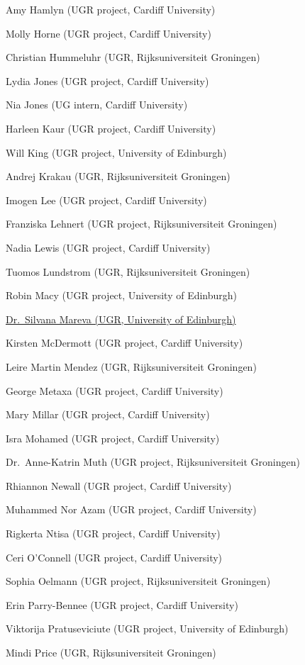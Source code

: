 \documentclass[
  12pt,
]{book}
\begin{document}
Amy Hamlyn (UGR project, Cardiff University)

Molly Horne (UGR project, Cardiff University)

Christian Hummeluhr (UGR, Rijksuniversiteit Groningen)

Lydia Jones (UGR project, Cardiff University)

Nia Jones (UG intern, Cardiff University)

Harleen Kaur (UGR project, Cardiff University)

Will King (UGR project, University of Edinburgh)

Andrej Krakau (UGR, Rijksuniversiteit Groningen)

Imogen Lee (UGR project, Cardiff University)

Franziska Lehnert (UGR project, Rijksuniversiteit Groningen)

Nadia Lewis (UGR project, Cardiff University)

Tuomos Lundstrom (UGR, Rijksuniversiteit Groningen)

Robin Macy (UGR project, University of Edinburgh)

\href{https://experts.exeter.ac.uk/40393-silvana-mareva}{Dr.~Silvana Mareva (UGR, University of Edinburgh)}

Kirsten McDermott (UGR project, Cardiff University)

Leire Martin Mendez (UGR, Rijksuniversiteit Groningen)

George Metaxa (UGR project, Cardiff University)

Mary Millar (UGR project, Cardiff University)

Isra Mohamed (UGR project, Cardiff University)

Dr.~Anne-Katrin Muth (UGR project, Rijksuniversiteit Groningen)

Rhiannon Newall (UGR project, Cardiff University)

Muhammed Nor Azam (UGR project, Cardiff University)

Rigkerta Ntisa (UGR project, Cardiff University)

Ceri O'Connell (UGR project, Cardiff University)

Sophia Oelmann (UGR project, Rijksuniversiteit Groningen)

Erin Parry-Bennee (UGR project, Cardiff University)

Viktorija Pratuseviciute (UGR project, University of Edinburgh)

Mindi Price (UGR, Rijksuniversiteit Groningen)
\end{document}
